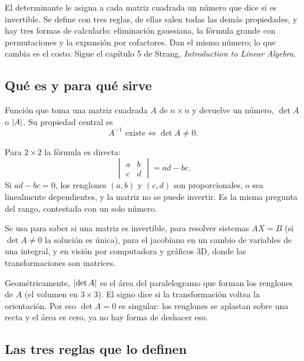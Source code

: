 \documentclass[11pt,letterpaper]{article}
\begin{document}
\begin{quick_sum}
    El determinante le asigna a cada matriz cuadrada un número que dice
    si es invertible. Se define con tres reglas, de ellas salen todas
    las demás propiedades, y hay tres formas de calcularlo: eliminación
    gaussiana, la fórmula grande con permutaciones y la expansión por
    cofactores. Dan el mismo número; lo que cambia es el costo. Sigue
    el capítulo 5 de Strang, \textit{Introduction to Linear Algebra}.
\end{quick_sum}

\subsection*{Qué es y para qué sirve}

\begin{definicion}[Determinante]
    Función que toma una matriz cuadrada $A$ de $n \times n$ y devuelve
    un número, $\det A$ o $\left\lvert A \right\rvert$. Su propiedad central es
    \[
        A^{-1} \text{ existe} \iff \det A \neq 0 .
    \]
\end{definicion}

Para $2 \times 2$ la fórmula es directa:
\[
    \begin{vmatrix} a & b \\ c & d \end{vmatrix} = ad - bc .
\]
Si $ad - bc = 0$, los renglones $(a, b)$ y $(c, d)$ son proporcionales,
o sea linealmente dependientes, y la matriz no se puede invertir. Es la
misma pregunta del rango, contestada con un solo número.

Se usa para saber si una matriz es invertible, para resolver sistemas
$AX = B$ (si $\det A \neq 0$ la solución es única), para el jacobiano en
un cambio de variables de una integral, y en visión por computadora y
gráficos 3D, donde las transformaciones son matrices.

\begin{idea}
    Geométricamente, $\left\lvert \det A \right\rvert$ es el área del paralelogramo que
    forman los renglones de $A$ (el volumen en $3 \times 3$). El signo
    dice si la transformación voltea la orientación. Por eso
    $\det A = 0$ es singular: los renglones se aplastan sobre una recta
    y el área es cero, ya no hay forma de deshacer eso.
\end{idea}


\subsection*{Las tres reglas que lo definen}
\end{document}
